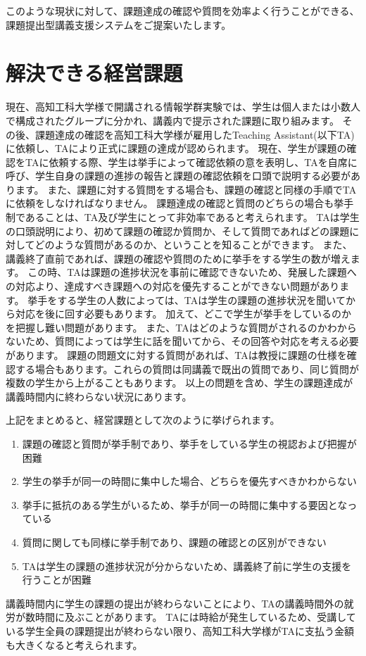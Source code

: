 \documentclass[a4j,titlepage]{ujarticle}
\begin{document}
このような現状に対して、課題達成の確認や質問を効率よく行うことができる、課題提出型講義支援システムをご提案いたします。

\section{解決できる経営課題}
現在、高知工科大学様で開講される情報学群実験では、学生は個人または小数人で構成されたグループに分かれ、講義内で提示された課題に取り組みます。
その後、課題達成の確認を高知工科大学様が雇用したTeaching Assistant(以下TA)に依頼し、TAにより正式に課題の達成が認められます。
現在、学生が課題の確認をTAに依頼する際、学生は挙手によって確認依頼の意を表明し、TAを自席に呼び、学生自身の課題の進捗の報告と課題の確認依頼を口頭で説明する必要があります。
また、課題に対する質問をする場合も、課題の確認と同様の手順でTAに依頼をしなければなりません。
課題達成の確認と質問のどちらの場合も挙手制であることは、TA及び学生にとって非効率であると考えられます。
TAは学生の口頭説明により、初めて課題の確認か質問か、そして質問であればどの課題に対してどのような質問があるのか、ということを知ることができます。
また、講義終了直前であれば、課題の確認や質問のために挙手をする学生の数が増えます。
この時、TAは課題の進捗状況を事前に確認できないため、発展した課題への対応より、達成すべき課題への対応を優先することができない問題があります。
挙手をする学生の人数によっては、TAは学生の課題の進捗状況を聞いてから対応を後に回す必要もあります。
加えて、どこで学生が挙手をしているのかを把握し難い問題があります。
また、TAはどのような質問がされるのかわからないため、質問によっては学生に話を聞いてから、その回答や対応を考える必要があります。
課題の問題文に対する質問があれば、TAは教授に課題の仕様を確認する場合もあります。これらの質問は同講義で既出の質問であり、同じ質問が複数の学生から上がることもあります。
以上の問題を含め、学生の課題達成が講義時間内に終わらない状況にあります。

上記をまとめると、経営課題として次のように挙げられます。
\begin{enumerate}[(1)]
\item 課題の確認と質問が挙手制であり、挙手をしている学生の視認および把握が困難
\item 学生の挙手が同一の時間に集中した場合、どちらを優先すべきかわからない
\item 挙手に抵抗のある学生がいるため、挙手が同一の時間に集中する要因となっている
\item 質問に関しても同様に挙手制であり、課題の確認との区別ができない
\item TAは学生の課題の進捗状況が分からないため、講義終了前に学生の支援を行うことが困難
\end{enumerate}
講義時間内に学生の課題の提出が終わらないことにより、TAの講義時間外の就労が数時間に及ぶことがあります。
TAには時給が発生しているため、受講している学生全員の課題提出が終わらない限り、高知工科大学様がTAに支払う金額も大きくなると考えられます。
\end{document}
